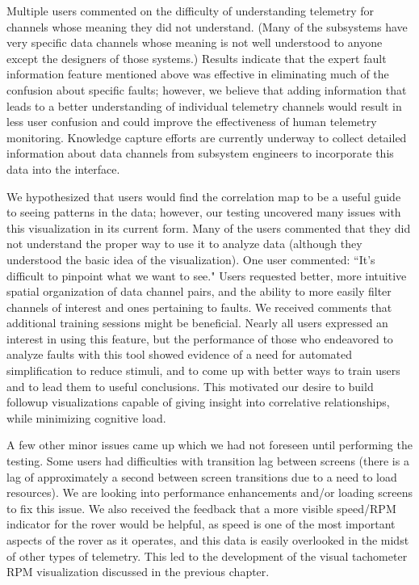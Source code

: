 Multiple users commented on the difficulty of understanding telemetry for channels whose meaning they did not understand. (Many of the subsystems have very specific data channels whose meaning is not well understood to anyone except the designers of those systems.) Results indicate that the expert fault information feature mentioned above was effective in eliminating much of the confusion about specific faults; however, we believe that adding information that leads to a better understanding of individual telemetry channels would result in less user confusion and could improve the effectiveness of human telemetry monitoring. Knowledge capture efforts are currently underway to collect detailed information about data channels from subsystem engineers to incorporate this data into the interface.

We hypothesized that users would find the correlation map to be a useful guide to seeing patterns in the data; however, our testing uncovered many issues with this visualization in its current form. Many of the users commented that they did not understand the proper way to use it to analyze data (although they understood the basic idea of the visualization). One user commented: ``It's difficult to pinpoint what we want to see." Users requested better, more intuitive spatial organization of data channel pairs, and the ability to more easily filter channels of interest and ones pertaining to faults. We received comments that additional training sessions might be beneficial. Nearly all users expressed an interest in using this feature, but the performance of those who endeavored to analyze faults with this tool showed evidence of a need for automated simplification to reduce stimuli, and to come up with better ways to train users and to lead them to useful conclusions. This motivated our desire to build followup visualizations capable of giving insight into correlative relationships, while minimizing cognitive load.

A few other minor issues came up which we had not foreseen until performing the testing. Some users had difficulties with transition lag between screens (there is a lag of approximately a second between screen transitions due to a need to load resources). We are looking into performance enhancements and/or loading screens to fix this issue. We also received the feedback that a more visible speed/RPM indicator for the rover would be helpful, as speed is one of the most important aspects of the rover as it operates, and this data is easily overlooked in the midst of other types of telemetry. This led to the development of the visual tachometer RPM visualization discussed in the previous chapter.

